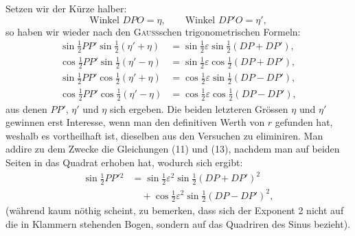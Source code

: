 Setzen wir der Kürze halber:
\[
\text{Winkel }DPO=\eta,\qquad\text{Winkel }DP'O=\eta',
\]
\noindent so haben wir wieder nach den \textsc{Gauss}schen trigonometrischen Formeln:
\begin{align*}
\sin\tfrac12PP'\sin\tfrac12(\eta'+\eta)&=\sin\tfrac12\varepsilon\sin\tfrac12(DP+DP'),\tag*{(11)}\\
\cos\tfrac12PP'\sin\tfrac12(\eta'-\eta)&=\sin\tfrac12\varepsilon\cos\tfrac12(DP+DP'),\tag*{(12)}\\
\sin\tfrac12PP'\cos\tfrac12(\eta'+\eta)&=\cos\tfrac12\varepsilon\sin\tfrac12(DP-DP'),\tag*{(13)}\\
\cos\tfrac12PP'\cos\tfrac12(\eta'-\eta)&=\cos\tfrac12\varepsilon\cos\tfrac12(DP-DP'),\tag*{(14)}
\end{align*}
\noindent aus denen $PP'$, $\eta'$ und $\eta$ sich ergeben. Die beiden letzteren Grössen $\eta$ und $\eta'$ gewinnen erst Interesse, wenn man den definitiven Werth von $r$ gefunden hat, weshalb es vortheilhaft ist, dieselben aus den Versuchen zu eliminiren. Man addire zu dem Zwecke die Gleichungen (11) und (13), nachdem man auf beiden Seiten in das Quadrat erhoben hat, wodurch sich ergibt:
\begin{equation*}
\begin{aligned}
\sin\tfrac12PP'{}^2&=\sin\tfrac12\varepsilon^2\sin\tfrac12(DP+DP')^2\\
&\quad+\cos\tfrac12\varepsilon^2\sin\tfrac12(DP-DP')^2,
\end{aligned}\tag*{(15)}
\end{equation*}
\noindent (während kaum nöthig scheint, zu bemerken, dass sich der Exponent 2 nicht auf die in Klammern stehenden Bogen, sondern auf das Quadriren des Sinus bezieht).


